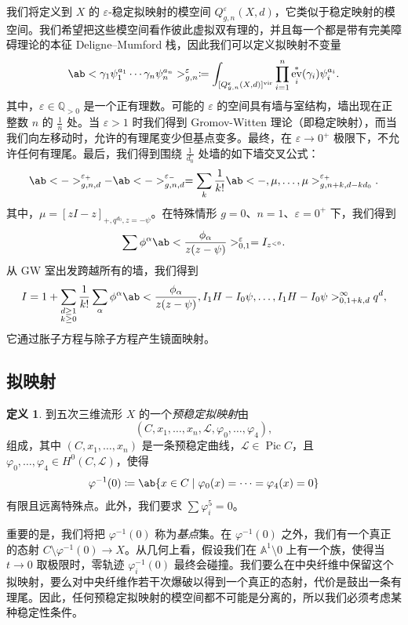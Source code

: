 \documentclass{amsart}
\theoremstyle{definition}
\newtheorem{defn}[thm]{定义}
\theoremstyle{remark}
\theoremstyle{plain}
\theoremstyle{definition}
\theoremstyle{remark}
\newcommand{\A}{\mathbb{A}}
\newcommand{\Q}{\mathbb{Q}}
\newcommand{\ep}{\varepsilon}
\newcommand{\mc}[1]{\mathcal{#1}}
\newcommand{\mr}[1]{\mathrm{#1}}
\newcommand{\1}{\mathbf{1}}
\newcommand{\2}{\mathbf{2}}
\newcommand{\3}{\mathbf{3}}
\newcommand{\vir}{\mr{vir}}
\DeclareMathOperator{\Pic}{Pic}
\DeclareMathOperator{\ev}{ev}
\begin{document}
我们将定义到 \(X\) 的 \(\ep\)-稳定拟映射的模空间 \(Q_{g,n}^{\ep}(X, d)\)，它类似于稳定映射的模空间。我们希望把这些模空间看作彼此虚拟双有理的，并且每一个都是带有完美障碍理论的本征 Deligne–Mumford 栈，因此我们可以定义拟映射不变量
\[ \ab< \gamma_1 \psi_1^{a_1} \cdots \gamma_n \psi_n^{a_n}>_{g,n}^{\ep} \coloneqq \int_{[Q_{g,n}^{\ep}(X,d)]^{\vir}} \prod_{i=1}^n \ev_i^*(\gamma_i) \psi_i^{a_i}. \]
其中，\(\ep \in \Q_{>0}\) 是一个正有理数。可能的 \(\ep\) 的空间具有墙与室结构，墙出现在正整数 \(n\) 的 \(\frac{1}{n}\) 处。当 \(\ep > 1\) 时我们得到 Gromov-Witten 理论（即稳定映射），而当我们向左移动时，允许的有理尾变少但基点变多。最终，在 \(\ep \to 0^+\) 极限下，不允许任何有理尾。最后，我们得到围绕 \(\frac{1}{d_0}\) 处墙的如下墙交叉公式：
\[ \ab<->_{g,n,d}^{\ep_+} - \ab<->_{g,n,d}^{\ep_-} = \sum_{k} \frac{1}{k!} \ab<-, \mu, \ldots, \mu>_{g,n+k, d-kd_0}^{\ep_+}. \]
其中，\(\mu = [zI-z]_{+, q^{d_0}, z=-\psi}\)。在特殊情形 \(g = 0\)、\(n = 1\)、\(\ep = 0^+\) 下，我们得到
\[ \sum \phi^{\alpha} \ab<\frac{\phi_{\alpha}}{z(z-\psi)}>^{\ep}_{0,1} = I_{z^{<0}}. \]
从 GW 室出发跨越所有的墙，我们得到
\[ I = 1 + \sum_{\substack{d \geq 1 \\ k \geq 0}} \frac{1}{k!} \sum_{\alpha} \phi^{\alpha} \ab< \frac{\phi_{\alpha}}{z(z-\psi)}, I_1 H - I_0 \psi, \ldots, I_1 H - I_0 \psi>_{0,1+k,d}^{\infty} q^d, \]
它通过胀子方程与除子方程产生镜面映射。

\subsection{拟映射}%
\label{sub:Quasimaps}

\begin{defn}
    到五次三维流形 \(X\) 的一个\textit{预稳定拟映射}由
    \[(C, x_1, \ldots, x_n, \mc{L}, \varphi_0, \ldots, \varphi_4),\] 
    组成，其中 \((C, x_1, \ldots, x_n)\) 是一条预稳定曲线，\(\mc{L} \in \Pic C\)，且 \(\varphi_0, \ldots, \varphi_4 \in H^0(C, \mc{L})\)，使得
    \[ \varphi^{-1}(0) \coloneqq \ab\{x \in C \mid \varphi_0(x) = \cdots = \varphi_4(x) = 0 \} \]
    有限且远离特殊点。此外，我们要求 \(\sum \varphi_i^5 = 0\)。
\end{defn}

重要的是，我们将把 \(\varphi^{-1}(0)\) 称为\textit{基点}集。在 \(\varphi^{-1}(0)\) 之外，我们有一个真正的态射 \(C \setminus \varphi^{-1}(0) \to X\)。从几何上看，假设我们在 \(\A^1 \setminus 0\) 上有一个族，使得当 \(t \to 0\) 取极限时，零轨迹 \(\varphi_i^{-1}(0)\) 最终会碰撞。我们要么在中央纤维中保留这个拟映射，要么对中央纤维作若干次爆破以得到一个真正的态射，代价是鼓出一条有理尾。因此，任何预稳定拟映射的模空间都不可能是分离的，所以我们必须考虑某种稳定性条件。
\end{document}
